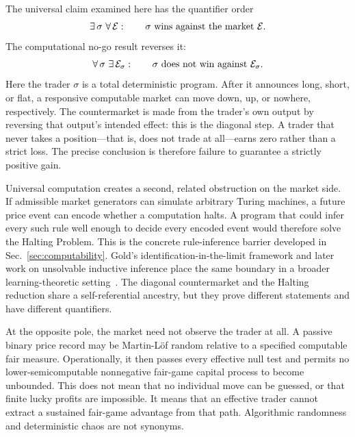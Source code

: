 \documentclass[aps,pra,reprint,superscriptaddress,amsmath,amssymb,floatfix]{revtex4-2}
\theoremstyle{plain}
\theoremstyle{definition}
\theoremstyle{remark}
\begin{document}
The universal claim examined here has the quantifier order
\begin{equation}
  \exists\,\sigma\ \forall\,\mathcal E:
  \qquad \sigma\ \hbox{wins against the market }\mathcal E .
  \label{eq:universalquantifiers}
\end{equation}
The computational no-go result reverses it:
\begin{equation}
  \forall\,\sigma\ \exists\,\mathcal E_\sigma:
  \qquad \sigma\ \hbox{does not win against }\mathcal E_\sigma .
  \label{eq:counterquantifiers}
\end{equation}
Here the trader \(\sigma\) is a total deterministic program. After it announces
long, short, or flat, a responsive computable market can move down, up, or
nowhere, respectively. The countermarket is made from the trader's own output
by reversing that output's intended effect: this is the diagonal step.
A trader that never takes a position---that is, does not trade at all---earns zero rather than a strict loss.
The precise conclusion is therefore failure to guarantee a strictly positive gain.

Universal computation creates a second, related obstruction on the market
side. If admissible market generators can simulate arbitrary Turing machines,
a future price event can encode whether a computation halts. A program that
could infer every such rule well enough to decide every encoded event would
therefore solve the Halting Problem. This is the concrete rule-inference
barrier developed in Sec.~\ref{sec:computability}. Gold's
identification-in-the-limit framework and later work on unsolvable inductive
inference place the same boundary in a broader learning-theoretic
setting~\cite{go-67,ad-91,angluin:83,2016-AlexanderKarlSvozil-ml,moore}.
The diagonal countermarket and the Halting reduction share a self-referential
ancestry, but they prove different statements and have different quantifiers.

At the opposite pole, the market need not observe the trader at all. A passive
binary price record may be Martin-L\"of random relative to a specified
computable fair measure. Operationally, it then passes every effective null
test and permits no lower-semicomputable nonnegative fair-game capital process
to become unbounded. This does not mean that no individual move can be guessed,
or that finite lucky profits are impossible. It means that an effective trader
cannot extract a sustained fair-game advantage from that path. Algorithmic
randomness and deterministic chaos are not synonyms.
\end{document}
